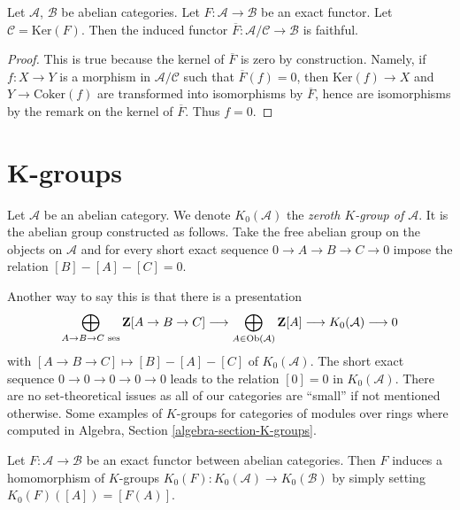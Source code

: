 \begin{lemma}
\label{lemma-quotient-by-kernel-exact-functor}
Let $\mathcal{A}$, $\mathcal{B}$ be abelian categories.
Let $F : \mathcal{A} \to \mathcal{B}$ be an exact functor.
Let $\mathcal{C} = \text{Ker}(F)$. Then the induced functor
$\overline{F} : \mathcal{A}/\mathcal{C} \to \mathcal{B}$ is
faithful.
\end{lemma}

\begin{proof}
This is true because the kernel of $\overline{F}$ is zero by
construction. Namely, if $f : X \to Y$ is a morphism in
$\mathcal{A}/\mathcal{C}$ such that $\overline{F}(f) = 0$, then
$\text{Ker}(f) \to X$ and $Y \to \text{Coker}(f)$ are transformed
into isomorphisms by $\overline{F}$, hence are isomorphisms by the
remark on the kernel of $\overline{F}$. Thus $f = 0$.
\end{proof}






\section{K-groups}
\label{section-K-groups}

\begin{definition}
\label{definition-K-zero}
Let $\mathcal{A}$ be an abelian category.
We denote $K_0(\mathcal{A})$ the
{\it zeroth $K$-group of $\mathcal{A}$}.
It is the abelian group constructed as follows.
Take the free abelian group
on the objects on $\mathcal{A}$
and for every short exact sequence
$0 \to A \to B \to C \to 0$
impose the relation $[B] - [A] - [C] = 0$.
\end{definition}

\noindent
Another way to say this is that there is a presentation
$$
\bigoplus_{A \to B \to C\text{ ses}}
\mathbf{Z}[A \to B \to C]
\longrightarrow
\bigoplus_{A \in \mathop{\rm Ob}\nolimits(\mathcal{A})}
\mathbf{Z}[A]
\longrightarrow
K_0(\mathcal{A})
\longrightarrow
0
$$
with $[A \to B \to C] \mapsto [B] - [A] - [C]$ of $K_0(\mathcal{A})$.
The short exact sequence $0 \to 0 \to 0 \to 0 \to 0$
leads to the relation $[0] = 0$ in $K_0(\mathcal{A})$.
There are no set-theoretical issues as all of our categories
are ``small'' if not mentioned otherwise.
Some examples of $K$-groups for categories of modules
over rings where computed in
Algebra, Section \ref{algebra-section-K-groups}.

\begin{lemma}
\label{lemma-exact-functor-K-groups}
Let $F : \mathcal{A} \to \mathcal{B}$ be an exact functor between
abelian categories. Then $F$ induces a homomorphism of $K$-groups
$K_0(F) : K_0(\mathcal{A}) \to K_0(\mathcal{B})$ by simply setting
$K_0(F)([A]) = [F(A)]$.
\end{lemma}

